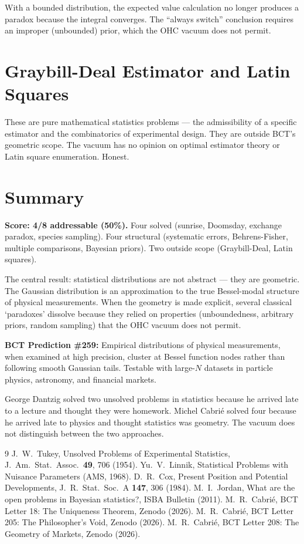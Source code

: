 \documentclass[aps,prl,twocolumn,superscriptaddress]{revtex4-2}
\begin{document}
With a bounded distribution, the expected value calculation no longer produces a paradox because the integral converges. The ``always switch'' conclusion requires an improper (unbounded) prior, which the OHC vacuum does not permit.

\section{Graybill-Deal Estimator and Latin Squares}

These are pure mathematical statistics problems --- the admissibility of a specific estimator and the combinatorics of experimental design. They are outside BCT's geometric scope. The vacuum has no opinion on optimal estimator theory or Latin square enumeration. Honest.

\section{Summary}

\textbf{Score: 4/8 addressable (50\%).} Four solved (sunrise, Doomsday, exchange paradox, species sampling). Four structural (systematic errors, Behrens-Fisher, multiple comparisons, Bayesian priors). Two outside scope (Graybill-Deal, Latin squares).

The central result: statistical distributions are not abstract --- they are geometric. The Gaussian distribution is an approximation to the true Bessel-modal structure of physical measurements. When the geometry is made explicit, several classical `paradoxes' dissolve because they relied on properties (unboundedness, arbitrary priors, random sampling) that the OHC vacuum does not permit.

\textbf{BCT Prediction \#259:} Empirical distributions of physical measurements, when examined at high precision, cluster at Bessel function nodes rather than following smooth Gaussian tails. Testable with large-$N$ datasets in particle physics, astronomy, and financial markets.

\begin{acknowledgments}
George Dantzig solved two unsolved problems in statistics because he arrived late to a lecture and thought they were homework. Michel Cabri\'e solved four because he arrived late to physics and thought statistics was geometry. The vacuum does not distinguish between the two approaches.
\end{acknowledgments}

\begin{thebibliography}{9}
 J.~W.~Tukey, Unsolved Problems of Experimental Statistics, J.\ Am.\ Stat.\ Assoc.\ \textbf{49}, 706 (1954).
 Yu.~V.~Linnik, Statistical Problems with Nuisance Parameters (AMS, 1968).
 D.~R.~Cox, Present Position and Potential Developments, J.\ R.\ Stat.\ Soc.\ A \textbf{147}, 306 (1984).
 M.~I.~Jordan, What are the open problems in Bayesian statistics?, ISBA Bulletin (2011).
 M.~R.~Cabri\'e, BCT Letter 18: The Uniqueness Theorem, Zenodo (2026).
 M.~R.~Cabri\'e, BCT Letter 205: The Philosopher's Void, Zenodo (2026).
 M.~R.~Cabri\'e, BCT Letter 208: The Geometry of Markets, Zenodo (2026).
\end{thebibliography}
\end{document}
